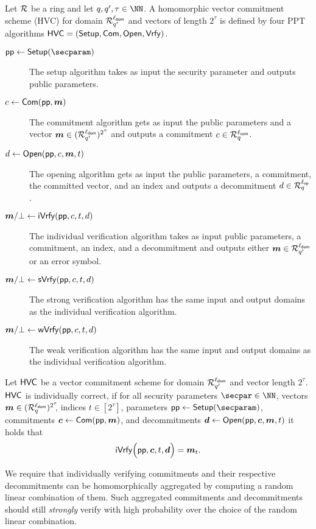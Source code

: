 \begin{definition}\label{def:hvc}
  Let $\mathcal{R}$ be a ring and let $q,q',\tau\in\NN$.
  A homomorphic vector commitment scheme (HVC) for domain $\mathcal{R}^{\ell_{\mathsf{dom}}}_{q'}$ and vectors of length $2^\tau$ is defined by four PPT algorithms $\mathsf{HVC}=(\mathsf{Setup},\mathsf{Com},\allowbreak\mathsf{Open},\mathsf{Vrfy})$.
\begin{description}
    \item[$\params\gets\setup(\secparam)$] The setup algorithm takes as input the security parameter and outputs public parameters.
    \item[$c \gets \mathsf{Com}(\mathsf{pp},\boldsymbol{m})$] The commitment algorithm gets as input the public parameters and a vector $\boldsymbol{m}\in(\mathcal{R}_{q'}^{\ell_{\mathsf{dom}}})^{2^\tau}$ and outputs a commitment $c\in\mathcal{R}_q^{\ell_{\mathsf{com}}}$.
    \item[$d \gets \mathsf{Open}(\mathsf{pp},c,\boldsymbol{m},t)$] The opening algorithm gets as input the public parameters, a commitment, the committed vector, and an index and outputs a decommitment $d\in\mathcal{R}_q^{{\ell_{\mathsf{op}}}}$.
    \item[$\boldsymbol{m}/\bot\gets \mathsf{iVrfy}(\mathsf{pp},c,t,d)$] The individual verification algorithm takes as input public parameters, a commitment, an index, and a decommitment and outputs either $\boldsymbol{m}\in\mathcal{R}^{\ell_{\mathsf{dom}}}_{q'}$ or an error symbol.
    \item[$\boldsymbol{m}/\bot\gets \mathsf{sVrfy}(\mathsf{pp},c,t,d)$] The strong verification algorithm has the same input and output domains as the individual verification algorithm.
    \item[$\boldsymbol{m}/\bot\gets \mathsf{wVrfy}(\mathsf{pp},c,t,d)$] The weak verification algorithm has the same input and output domains as the individual verification algorithm.
  \end{description}
\end{definition}
\begin{definition}
Let $\mathsf{HVC}$ be a vector commitment scheme for domain $\mathcal{R}^{\ell_{\mathsf{dom}}}_{q'}$ and vector length $2^\tau$.
  $\mathsf{HVC}$ is individually correct, if for all security parameters $\secpar\in\NN$, vectors $\boldsymbol{m}\in(\mathcal{R}_q^{\ell_{\mathsf{dom}}})^{2^\tau}\!\!$, indices $t\in[2^\tau]$, parameters $\params \gets \setup(\secparam)$, commitments $\boldsymbol{c} \gets \mathsf{Com}(\mathsf{pp},\boldsymbol{m})$, and decommitments $\boldsymbol{d} \gets \mathsf{Open}(\mathsf{pp},\boldsymbol{c},\boldsymbol{m},t)$ it holds that
  \[
    \mathsf{iVrfy}\Bigl(\mathsf{pp},\boldsymbol{c},t,\boldsymbol{d}\Bigr) = \boldsymbol{m}_{t}.
  \]
\end{definition}
%
We require that individually verifying commitments and their respective decommitments can be homomorphically aggregated by computing a random linear combination of them.
Such aggregated commitments and decommitments should still \emph{strongly} verify with high probability over the choice of the random linear combination.

